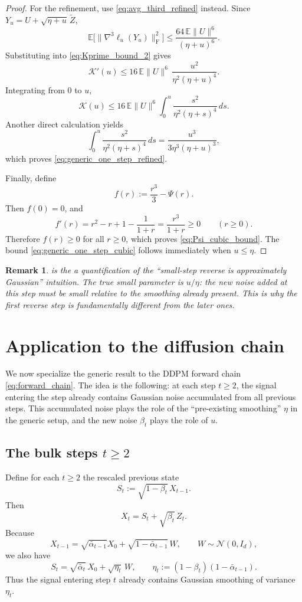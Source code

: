 \documentclass[11pt]{article}
\def\E{\mathbb{E}}
\newcommand{\norm}[1]{\|#1\|}
\newcommand{\frobnorm}[1]{\|#1\|_{\mathrm{F}}}
\newcommand{\PsiFn}{\Psi}
\newtheorem{remark}{Remark}
\begin{document}
\begin{proof}
For the refinement, use \eqref{eq:avg_third_refined} instead. Since \(Y_u=U+\sqrt{\eta+u}\,\widetilde Z\),
\[
\E\big[\frobnorm{\nabla^3\ell_u(Y_u)}^2\big]
\le
\frac{64\,\E\norm{U}^6}{(\eta+u)^6}.
\]
Substituting into \eqref{eq:Kprime_bound_2} gives
\[
\mathcal K'(u)
\le
16\,\E\norm{U}^6\,\frac{u^2}{\eta^2(\eta+u)^4}.
\]
Integrating from \(0\) to \(u\),
\[
\mathcal K(u)
\le
16\,\E\norm{U}^6\int_0^u \frac{s^2}{\eta^2(\eta+s)^4}\,ds.
\]
Another direct calculation yields
\[
\int_0^u \frac{s^2}{\eta^2(\eta+s)^4}\,ds
=
\frac{u^3}{3\eta^3(\eta+u)^3},
\]
which proves \eqref{eq:generic_one_step_refined}.

Finally, define
\[
f(r):=\frac{r^3}{3}-\PsiFn(r).
\]
Then \(f(0)=0\), and
\[
f'(r)=r^2-r+1-\frac{1}{1+r}=\frac{r^3}{1+r}\ge 0
\qquad (r\ge 0).
\]
Therefore \(f(r)\ge 0\) for all \(r\ge 0\), which proves \eqref{eq:Psi_cubic_bound}. The bound \eqref{eq:generic_one_step_cubic} follows immediately when \(u\le\eta\).
\end{proof}

\begin{remark}
 is the a quantification of the ``small-step reverse is approximately Gaussian'' intuition. The true small parameter is \(u/\eta\): the new noise added at this step must be small relative to the smoothing already present. This is why the first reverse step is fundamentally different from the later ones.
\end{remark}

\section{Application to the diffusion chain}
\label{sec:application_diffusion}

We now specialize the generic result to the DDPM forward chain \eqref{eq:forward_chain}. The idea is the following: at each step \(t\ge 2\), the signal entering the step already contains Gaussian noise accumulated from all previous steps. This accumulated noise plays the role of the ``pre-existing smoothing'' \(\eta\) in the generic setup, and the new noise \(\beta_t\) plays the role of \(u\).

\subsection{The bulk steps \(t\ge 2\)}

Define for each \(t\ge 2\) the rescaled previous state
\[
S_t := \sqrt{1-\beta_t}\,X_{t-1}.
\]
Then
\[
X_t = S_t + \sqrt{\beta_t}\,Z_t.
\]
Because
\[
X_{t-1}=\sqrt{\bar\alpha_{t-1}}X_0 + \sqrt{1-\bar\alpha_{t-1}}\,W,
\qquad W\sim\mathcal N(0,I_d),
\]
we also have
\begin{equation}
\label{eq:S_t_decomposition}
S_t = \sqrt{\bar\alpha_t}\,X_0 + \sqrt{\eta_t}\,W,
\qquad
\eta_t := (1-\beta_t)(1-\bar\alpha_{t-1}).
\end{equation}
Thus the signal entering step \(t\) already contains Gaussian smoothing of variance \(\eta_t\). 
\end{document}
